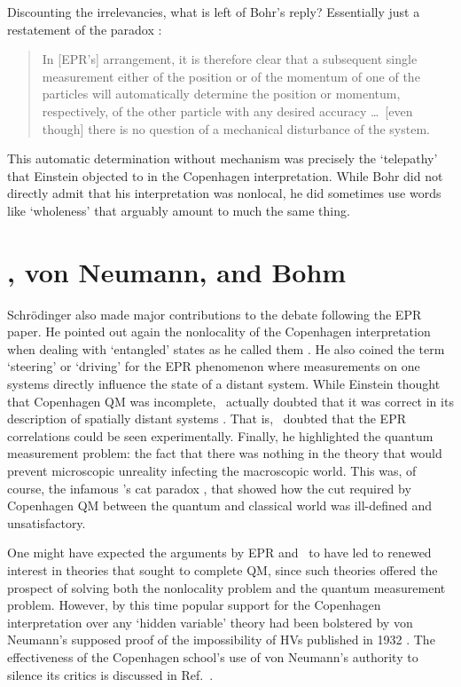 \documentclass[12pt]{iopart}
\begin{document}
Discounting the irrelevancies, what is left of Bohr's reply? 
Essentially just a restatement of the paradox \cite{Boh35}:  
  \begin{quote}
In  [EPR's] arrangement, it is therefore
clear that a subsequent single measurement
either of the position or of the momentum of
one of the particles will automatically determine
the position or momentum, respectively, of the
other particle with any desired accuracy \ldots\ [even though] there 
is no question of a mechanical disturbance of the system.
\end{quote}
This automatic determination without mechanism was precisely the 
`telepathy' \cite{Ein46} that Einstein objected to in the Copenhagen interpretation. 
While Bohr did not directly admit that his interpretation was nonlocal, he did sometimes 
use words like `wholeness' \cite{Boh63} that arguably \cite{dEs84,Cus94b} 
amount to much the same thing. 

\section{\sch, von Neumann, and Bohm} \label{sec:SVB}

Schr\"odinger \cite{Sch35,Sch35b,Sch36} also made major contributions to the debate following the EPR paper. He pointed out again the nonlocality of the Copenhagen interpretation when dealing with 
`entangled' states as he called them \cite{Sch35}. He also coined the term
 `steering' \cite{Sch35b} or `driving' \cite{Sch36} for the EPR phenomenon 
 where measurements on one systems directly influence the state of a  distant system.  
While Einstein  thought that Copenhagen QM was incomplete, \sch\ actually doubted that it was 
correct in its description of spatially distant systems \cite{Sch36}. That is, \sch\ doubted that 
the EPR correlations could be seen experimentally.  
Finally, he highlighted the quantum measurement problem: the fact  that there was nothing 
in the theory that would prevent microscopic unreality infecting the macroscopic world. 
This was, of course, the infamous \sch's cat paradox \cite{Sch35}, that showed how 
the cut required by Copenhagen QM between the quantum and 
classical world was ill-defined and unsatisfactory. 

One might have expected the arguments by EPR and \sch\ to have 
 led to renewed interest in theories that sought to complete QM, since such theories  
 offered the prospect of solving both the nonlocality problem and the quantum measurement problem. 
 However, by this time popular support for the Copenhagen interpretation over any `hidden variable' theory had been bolstered by von Neumann's supposed proof of the 
impossibility of HVs published in 1932 \cite{Von32}. The effectiveness of the Copenhagen school's 
use of von Neumann's authority to silence its critics is discussed in Ref.~\cite{Fey95}. 
\end{document}
